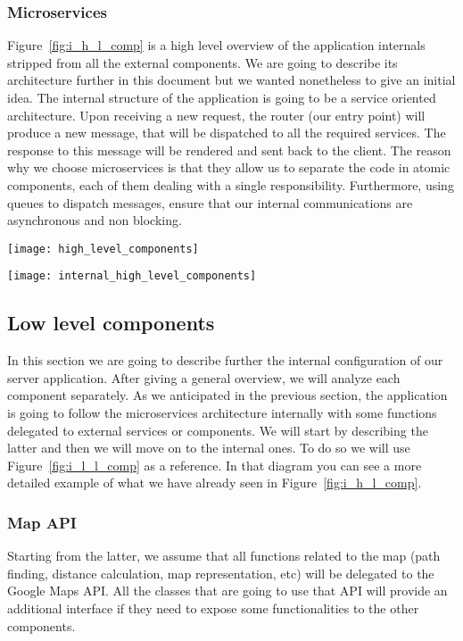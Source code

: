 \subsubsection{Microservices}
Figure~\ref{fig:i_h_l_comp} is a high level overview of the application internals stripped from all
the external components. We are going to describe its architecture further in this document
but we wanted nonetheless to give an initial idea.
The internal structure of the application is going to be a service oriented architecture.
Upon receiving a new request, the router (our entry point) will produce a new message,
that will be dispatched to all the required services. The response to this message will
be rendered and sent back to the client.
The reason why we choose microservices is that they allow us to separate the code in
atomic components, each of them dealing with a single responsibility.
Furthermore, using queues to dispatch messages, ensure that our internal communications
are asynchronous and non blocking.

\begin{sidewaysfigure}
\centering
\texttt{[image: high\_level\_components]}
\caption{Component view: High Level Architecture}
\label{fig:h_l_comp}
\end{sidewaysfigure}

\begin{sidewaysfigure}
\centering
\texttt{[image: internal\_high\_level\_components]}
\caption{Component view: Internal High Level Architecture}
\label{fig:i_h_l_comp}
\end{sidewaysfigure}

\pagebreak
\subsection{Low level components}
In this section we are going to describe further the internal configuration of our server
application. After giving a general overview, we will analyze each component separately.
As we anticipated in the previous section, the application is going to follow the microservices
architecture internally with some functions delegated to external services or components.
We will start by describing the latter and then we will move on to the internal ones.
To do so we will use Figure~\ref{fig:i_l_l_comp} as a reference.
In that diagram you can see a more detailed example of what we have already seen
in Figure~\ref{fig:i_h_l_comp}.

\subsubsection{Map API}
Starting from the latter, we assume that all functions related to the map (path finding,
distance calculation, map representation, etc) will be delegated to the Google Maps API.
All the classes that are going to use that API will provide an additional interface if they 
need to expose some functionalities to the other components.

